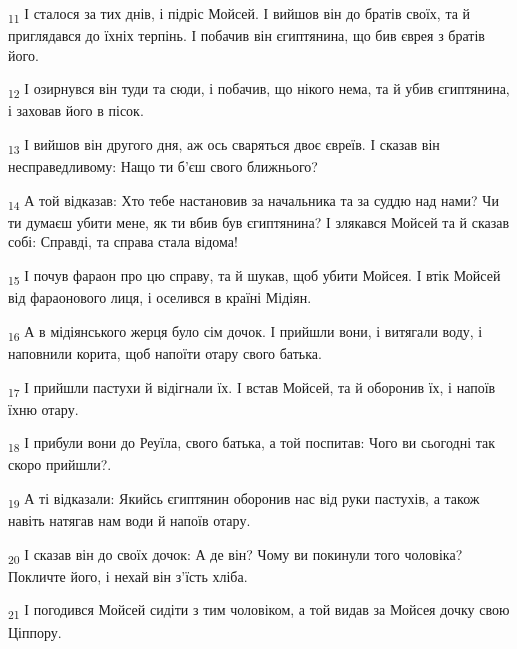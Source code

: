 \begin{tcolorbox}
\textsubscript{11} І сталося за тих днів, і підріс Мойсей. І вийшов він до братів своїх, та й приглядався до їхніх терпінь. І побачив він єгиптянина, що бив єврея з братів його.
\end{tcolorbox}
\begin{tcolorbox}
\textsubscript{12} І озирнувся він туди та сюди, і побачив, що нікого нема, та й убив єгиптянина, і заховав його в пісок.
\end{tcolorbox}
\begin{tcolorbox}
\textsubscript{13} І вийшов він другого дня, аж ось сваряться двоє євреїв. І сказав він несправедливому: Нащо ти б'єш свого ближнього?
\end{tcolorbox}
\begin{tcolorbox}
\textsubscript{14} А той відказав: Хто тебе настановив за начальника та за суддю над нами? Чи ти думаєш убити мене, як ти вбив був єгиптянина? І злякався Мойсей та й сказав собі: Справді, та справа стала відома!
\end{tcolorbox}
\begin{tcolorbox}
\textsubscript{15} І почув фараон про цю справу, та й шукав, щоб убити Мойсея. І втік Мойсей від фараонового лиця, і оселився в країні Мідіян.
\end{tcolorbox}
\begin{tcolorbox}
\textsubscript{16} А в мідіянського жерця було сім дочок. І прийшли вони, і витягали воду, і наповнили корита, щоб напоїти отару свого батька.
\end{tcolorbox}
\begin{tcolorbox}
\textsubscript{17} І прийшли пастухи й відігнали їх. І встав Мойсей, та й оборонив їх, і напоїв їхню отару.
\end{tcolorbox}
\begin{tcolorbox}
\textsubscript{18} І прибули вони до Реуїла, свого батька, а той поспитав: Чого ви сьогодні так скоро прийшли?.
\end{tcolorbox}
\begin{tcolorbox}
\textsubscript{19} А ті відказали: Якийсь єгиптянин оборонив нас від руки пастухів, а також навіть натягав нам води й напоїв отару.
\end{tcolorbox}
\begin{tcolorbox}
\textsubscript{20} І сказав він до своїх дочок: А де він? Чому ви покинули того чоловіка? Покличте його, і нехай він з'їсть хліба.
\end{tcolorbox}
\begin{tcolorbox}
\textsubscript{21} І погодився Мойсей сидіти з тим чоловіком, а той видав за Мойсея дочку свою Ціппору.
\end{tcolorbox}
